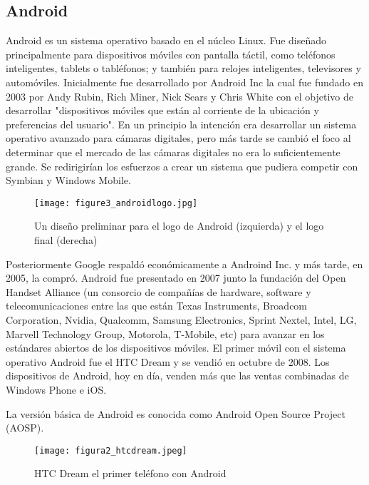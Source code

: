 		\newpage
		\thispagestyle{plain}
		
		\subsection{Android}
			\par
				Android es un sistema operativo basado en el núcleo Linux. Fue diseñado principalmente para dispositivos móviles con pantalla táctil, como teléfonos inteligentes, tablets o tabléfonos; y también para relojes inteligentes, televisores y automóviles. Inicialmente fue desarrollado por Android Inc la cual fue fundado en 2003 por Andy Rubin, Rich Miner, Nick Sears y Chris White con el objetivo de desarrollar "dispositivos móviles que están al corriente de la ubicación y preferencias del usuario". En un principio la intención era desarrollar un sistema operativo avanzado para cámaras digitales, pero más tarde se cambió el foco al determinar que el mercado de las cámaras digitales no era lo suficientemente grande. Se redirigirían los esfuerzos a crear un sistema que pudiera competir con Symbian y Windows Mobile.
				
				\begin{figure}[h]
					\centering
					\texttt{[image: figure3\_androidlogo.jpg]}
					\caption{Un diseño preliminar para el logo de Android (izquierda) y el logo final (derecha)}
				\end{figure}
			
			\par \noindent
				 Posteriormente Google respaldó económicamente a Androind Inc. y más tarde, en 2005, la compró. Android fue presentado en 2007 junto la fundación del Open Handset Alliance (un consorcio de compañías de hardware, software y telecomunicaciones entre las que están Texas Instruments, Broadcom Corporation, Nvidia, Qualcomm, Samsung Electronics, Sprint Nextel, Intel, LG, Marvell Technology Group, Motorola, T-Mobile, etc) para avanzar en los estándares abiertos de los dispositivos móviles. El primer móvil con el sistema operativo Android fue el HTC Dream y se vendió en octubre de 2008. Los dispositivos de Android, hoy en día, venden más que las ventas combinadas de Windows Phone e iOS.
			
			\par \noindent
				La versión básica de Android es conocida como Android Open Source Project (AOSP).
			
			\begin{figure}[h]
				\centering
				\texttt{[image: figura2\_htcdream.jpeg]}
				\caption{HTC Dream el primer teléfono con Android}
			\end{figure}
		
